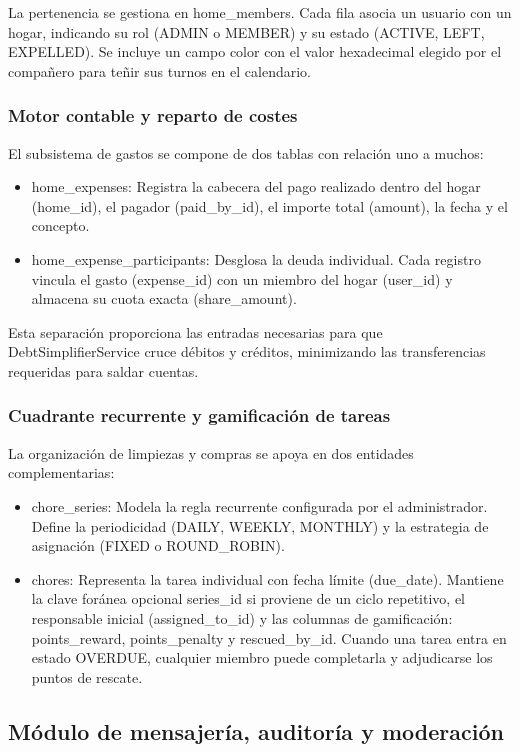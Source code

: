 La pertenencia se gestiona en home_members. Cada fila asocia un usuario con un hogar, indicando su rol (ADMIN o MEMBER) y su estado (ACTIVE, LEFT, EXPELLED). Se incluye un campo color con el valor hexadecimal elegido por el compañero para teñir sus turnos en el calendario.

\subsubsection{Motor contable y reparto de costes}
El subsistema de gastos se compone de dos tablas con relación uno a muchos:
\begin{itemize}
    \item home_expenses: Registra la cabecera del pago realizado dentro del hogar (home_id), el pagador (paid_by_id), el importe total (amount), la fecha y el concepto.
    \item home_expense_participants: Desglosa la deuda individual. Cada registro vincula el gasto (expense_id) con un miembro del hogar (user_id) y almacena su cuota exacta (share_amount).
\end{itemize}
Esta separación proporciona las entradas necesarias para que DebtSimplifierService cruce débitos y créditos, minimizando las transferencias requeridas para saldar cuentas.

\subsubsection{Cuadrante recurrente y gamificación de tareas}
La organización de limpiezas y compras se apoya en dos entidades complementarias:
\begin{itemize}
    \item chore_series: Modela la regla recurrente configurada por el administrador. Define la periodicidad (DAILY, WEEKLY, MONTHLY) y la estrategia de asignación (FIXED o ROUND_ROBIN).
    \item chores: Representa la tarea individual con fecha límite (due_date). Mantiene la clave foránea opcional series_id si proviene de un ciclo repetitivo, el responsable inicial (assigned_to_id) y las columnas de gamificación: points_reward, points_penalty y rescued_by_id. Cuando una tarea entra en estado OVERDUE, cualquier miembro puede completarla y adjudicarse los puntos de rescate.
\end{itemize}

\subsection{Módulo de mensajería, auditoría y moderación}

